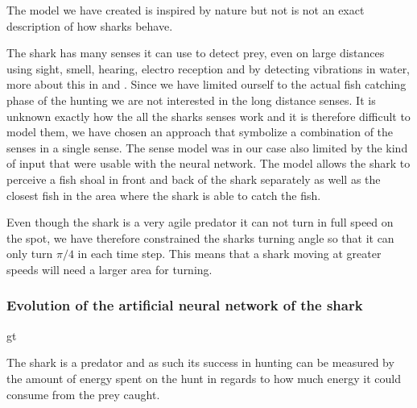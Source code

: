 The model we have created is inspired by nature but not is not an exact description of how sharks behave.

The shark has many senses it can use to detect prey, even on large distances using sight, smell, hearing, electro reception and by detecting vibrations in water, more about this in \cite{shark_vision} and \cite{shark_electric}. Since we have limited ourself to the actual fish catching phase of the hunting we are not interested in the long distance senses.  It is unknown exactly how the all the sharks senses work and it is therefore  difficult to model them, we have chosen an approach that symbolize a combination of the senses in a single sense. The sense model was in our case also limited by the kind of input that were usable with the neural network. The model allows the shark to perceive a fish shoal in front and back of the shark separately as well as the closest fish in the area where the shark is able to catch the fish.

Even though the shark is a very agile predator it can not turn in full speed on the spot, we have therefore constrained the sharks turning angle so that it can only turn $\pi/4$ in each time step. This means that a shark moving at greater speeds will need a larger area for turning.

\subsubsection{Evolution of the artificial neural network of the shark}
gt

The shark is a predator and as such its success in hunting can be measured by the amount of energy spent on the hunt in regards to how much energy it could consume from the prey caught. 
